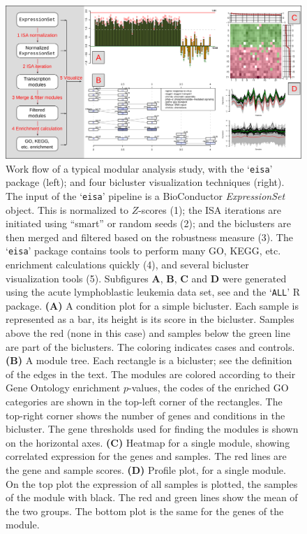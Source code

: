 \documentclass{bioinfo}
\newcommand{\Rpackage}[1]{`\texttt{#1}'}
\newcommand{\Rclass}[1]{\textsl{#1}}
\newcommand{\subfig}[1]{\textbf{#1}}
\begin{document}
\begin{figure}
\centering
\includegraphics[width=\textwidth]{isa2workflow3}
\caption{Work flow of a typical modular analysis study, with the
  \Rpackage{eisa} package (left); and four bicluster visualization
  techniques (right). The input of the \Rpackage{eisa} pipeline is a
  BioConductor \Rclass{ExpressionSet} object. This is normalized to
  $Z$-scores (1); the ISA iterations are initiated using ``smart'' or
  random seeds (2); and the biclusters are then merged and filtered
  based on the robustness measure (3). The \Rpackage{eisa} package
  contains tools to perform many GO, KEGG, etc. enrichment calculations
  quickly (4), and several bicluster visualization tools (5).
  Subfigures \subfig{A}, \subfig{B}, \subfig{C} and \subfig{D} were
generated
  using the acute lymphoblastic leukemia data set, see
  \cite{chiaretti04} and the \Rpackage{ALL} R package.
  \subfig{(A)} A condition plot for a simple bicluster. Each sample is
  represented as a bar, its height is its score in the bicluster.
  Samples above the red (none in this case) and samples
  below the green line are part of the biclusters. The coloring
  indicates cases and controls.
  \subfig{(B)} A module tree. Each rectangle is a bicluster; see the
  definition of the edges in the text. The modules are colored
  according to their Gene Ontology enrichment $p$-values, the codes of
  the enriched GO categories are shown in the top-left corner of the
  rectangles. The top-right corner shows the number of genes and
  conditions in the bicluster. The gene thresholds used for finding
  the modules is shown on the horizontal axes.
  \subfig{(C)} Heatmap for a single module, showing correlated
  expression for the genes and samples. The red lines are the gene and
  sample scores.
  \subfig{(D)} Profile plot, for a single module. On the top plot the
  expression of all samples is plotted, the samples of the module
  with black. The red and green lines show the mean of the two
  groups. The bottom plot is the same for the genes of the module.
}
\label{fig:workflow}
\end{figure}
\end{document}
